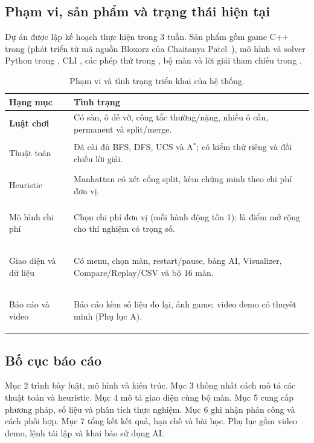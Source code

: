 \documentclass[a4paper]{article}
\newcommand{\tep}[1]{{\small\ttfamily\detokenize{#1}}}
\newcommand{\astar}{\texorpdfstring{A\ensuremath{^*}}{A*}}
\begin{document}
\subsection{Phạm vi, sản phẩm và trạng thái hiện tại}
Dự án được lập kế hoạch thực hiện trong 3 tuần. Sản phẩm gồm game C++ trong \tep{code/} (phát triển từ mã nguồn Bloxorz của Chaitanya Patel~\cite{upstream}), mô hình và solver Python trong \tep{ai/}, CLI \tep{main.py}, các phép thử trong \tep{tests/}, bộ màn và lời giải tham chiếu trong \tep{code/data/}.
\begin{table}[H]
\centering
\small
\renewcommand{\arraystretch}{1.4}
\setlength{\tabcolsep}{8pt}

\begin{tabularx}{\textwidth}{
    |>{\raggedright\arraybackslash\bfseries}p{3.2cm}
    |>{\raggedright\arraybackslash}X|
}
\hline
\rowcolor{blue!12}
Hạng mục & \textbf{Tình trạng} \\
\hline

Luật chơi &
Có sàn, ô dễ vỡ, công tắc thường/nặng, nhiều ô cầu,
permanent và split/merge. \\
\hline

Thuật toán &
Đã cài đủ BFS, DFS, UCS và \astar{};
có kiểm thử riêng và đối chiếu lời giải. \\
\hline

Heuristic &
Manhattan có xét cổng split, kèm chứng minh
theo chi phí đơn vị. \\
\hline

Mô hình chi phí &
Chọn chi phí đơn vị (mỗi hành động tốn 1);
\tep{cost_fn} là điểm mở rộng cho thí nghiệm có trọng số. \\
\hline

Giao diện và dữ liệu &
Có menu, chọn màn, restart/pause, bảng AI,
Visualizer, Compare/Replay/CSV và bộ 16 màn. \\
\hline

Báo cáo và video &
Báo cáo kèm số liệu đo lại, ảnh game;
video demo có thuyết minh (Phụ lục A). \\
\hline
\end{tabularx}

\caption{Phạm vi và tình trạng triển khai của hệ thống.}
\label{tab:pham-vi}
\end{table}



\subsection{Bố cục báo cáo}
Mục 2 trình bày luật, mô hình và kiến trúc. Mục 3 thống nhất cách mô tả các thuật toán và heuristic. Mục 4 mô tả giao diện cùng bộ màn. Mục 5 cung cấp phương pháp, số liệu và phân tích thực nghiệm. Mục 6 ghi nhận phân công và cách phối hợp. Mục 7 tổng kết kết quả, hạn chế và bài học. Phụ lục gồm video demo, lệnh tái lập và khai báo sử dụng AI.
\end{document}

